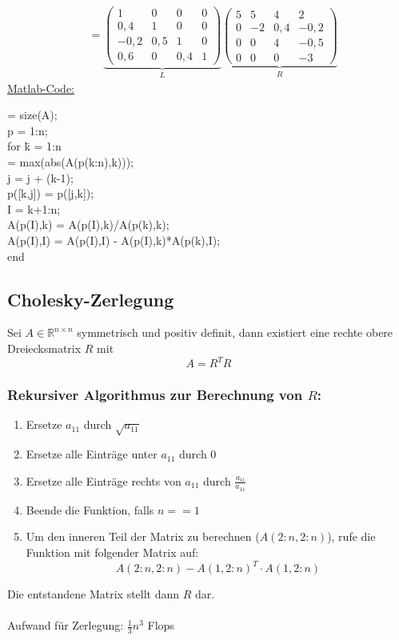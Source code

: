 \documentclass[4pt,a4paper]{scrartcl}
\begin{document}
\begin{multicols}{4}
\begin{equation*}
\begin{split}
&=\underbrace{\begin{pmatrix}1 & 0 & 0 & 0 \\ 0,4 & 1 & 0 & 0 \\ -0,2 & 0,5 & 1 & 0 \\ 0,6 & 0 & 0,4 & 1\end{pmatrix}}_{L}\underbrace{\begin{pmatrix}5 & 5 & 4 & 2 \\ 0 & -2 & 0,4 & -0,2 \\ 0 & 0 & 4 & -0,5 \\ 0 & 0 & 0 & -3\end{pmatrix}}_{R}
\end{split}
\end{equation*}
\underline{Matlab-Code:}
\begin{tabbing}
[n,$\sim$] = size(A);\\
p = 1:n;\\
for \=k = 1:n\\
    \>[$\sim$,j] = max(abs(A(p(k:n),k)));\\
    \>j = j + (k-1);\\
    \>p([k,j]) = p([j,k]);\\
    \>I = k+1:n;\\
    \>A(p(I),k) = A(p(I),k)/A(p(k),k);\\
    \>A(p(I),I) = A(p(I),I) - A(p(I),k)*A(p(k),I);\\
end
\end{tabbing}

\subsection{Cholesky-Zerlegung}
Sei $A\in\mathbb{R}^{n\times n}$ symmetrisch und positiv definit, dann existiert eine rechte obere Dreiecksmatrix $R$ mit
\begin{equation*}
A=R^TR
\end{equation*}
\subsubsection{Rekursiver Algorithmus zur Berechnung von $R$:}
\begin{enumerate}
\item Ersetze $a_{11}$ durch $\sqrt{a_{11}}$
\item Ersetze alle Einträge unter $a_{11}$ durch $0$
\item Ersetze alle Einträge rechts von $a_{11}$ durch $\frac{a_{1i}}{a_{11}}$
\item Beende die Funktion, falls $n==1$
\item Um den inneren Teil der Matrix zu berechnen ($A(2:n,2:n)$), rufe die Funktion mit folgender Matrix auf:
\begin{equation*}
A(2:n,2:n)-A(1,2:n)^T\cdot A(1,2:n)
\end{equation*}
\end{enumerate}
Die entstandene Matrix stellt dann $R$ dar.\\\\
Aufwand für Zerlegung: $\frac{1}{3}n^3$ Flops


\end{multicols}
\end{document}
